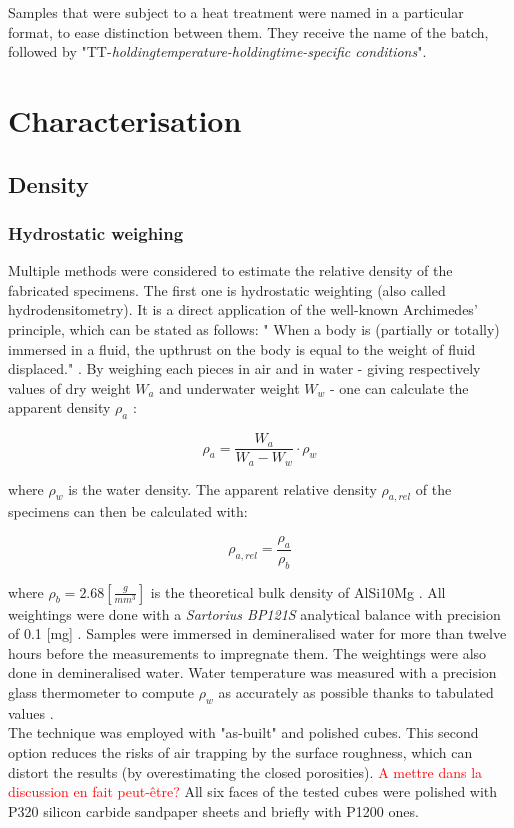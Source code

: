 Samples that were subject to a heat treatment were named in a particular format, to ease distinction between them. They receive the name of the batch, followed by "TT-\textit{holdingtemperature-holdingtime-specific conditions}".

\section{Characterisation}

\subsection{Density}

\subsubsection{Hydrostatic weighing}

Multiple methods were considered to estimate the relative density of the fabricated specimens. The first one is hydrostatic weighting (also called hydrodensitometry). It is a direct application of the well-known Archimedes' principle, which can be stated as follows: " When a body is (partially or totally) immersed in a fluid, the upthrust on the body is equal to the weight of fluid displaced." \parencite{ADictionaryofPhysics}. By weighing each pieces in air and in water - giving respectively values of dry weight $W_a$ and underwater weight $W_w$ - one can calculate the apparent density $\rho_a$ \parencite{MethArch}:

$$\rho_a=\frac{W_a}{W_a-W_w} \cdot \rho_w $$

where $\rho_w$ is the water density. The apparent relative density $\rho_{a,rel}$ of the specimens can then be calculated with:

$$\rho_{a,rel} = \frac{\rho_a}{\rho_b} $$

where $\rho_b = 2.68 [\frac{g}{mm^3}]$ is the theoretical bulk density of AlSi10Mg \parencite{Bulk}. All weightings were done with a \textit{Sartorius BP121S} analytical balance with precision of 0.1 [mg] \parencite{Balance}. Samples were immersed in demineralised water for more than twelve hours before the measurements to impregnate them. The weightings were also done in demineralised water. Water temperature was measured with a precision glass thermometer to compute $\rho_w$ as accurately as possible thanks to tabulated values \parencite{Eau}.\\

The technique was employed with "as-built" and polished cubes. This second option reduces the risks of air trapping by the surface roughness, which can distort the results (by overestimating the closed porosities). \textcolor{red}{A mettre dans la discussion en fait peut-être?} %
All six faces of the tested cubes were polished with P320 silicon carbide sandpaper sheets and briefly with P1200 ones.\\

